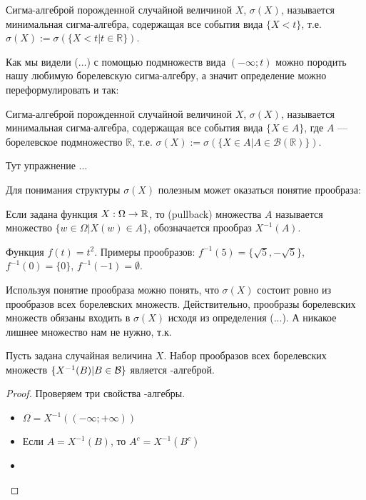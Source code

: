 {\begin{mydef}
Сигма-алгеброй порожденной случайной величиной $ X $, $ \sigma(X) $, называется минимальная сигма-алгебра, содержащая все события вида $ \{X<t\} $, т.е. $ \sigma(X):=\sigma(\{X<t|t\in \mathbb{R}\}) $.
\end{mydef}

Как мы видели (...) с помощью подмножеств вида $ (-\infty;t) $ можно породить нашу любимую борелевскую сигма-алгебру, а значит определение можно переформулировать и так:

\begin{mydef}
Сигма-алгеброй порожденной случайной величиной $ X $, $ \sigma(X) $, называется минимальная сигма-алгебра, содержащая все события вида $ \{X\in A\} $, где $ A $ --- борелевское подмножество $ \mathbb{R} $, т.е. $ \sigma(X):=\sigma(\{X\in A|A\in \mathcal{B}(\mathbb{R})\}) $.
\end{mydef}

Тут упражнение ...

Для понимания структуры $ \sigma(X) $ полезным может оказаться понятие прообраза:

\begin{mydef} Если задана функция $X:\Omega \rightarrow \mathbb R$, то  (pullback) множества $A$ называется множество $\{w\in\Omega|X(w)\in A\}$, обозначается прообраз $X^{-1}(A)$.
\end{mydef}

\begin{myex} Функция $f(t)=t^{2}$. Примеры прообразов: $f^{-1}(5)=\{\sqrt{5},-\sqrt{5}\}$, $f^{-1}(0)=\{0\}$, $f^{-1}(-1)=\emptyset$.
\end{myex}

Используя понятие прообраза можно понять, что $ \sigma(X) $ состоит ровно из прообразов всех борелевских множеств. Действительно, прообразы борелевских множеств обязаны входить в $ \sigma(X) $ исходя из определения (...). А никакое лишнее множество нам не нужно, т.к. 

\begin{myth} Пусть задана случайная величина $X$. Набор прообразов всех борелевских множеств $\{X^{-1}(B)|B\in\mathcal{B}\}$ является \s-алгеброй.
\end{myth}
\begin{proof} Проверяем три свойства \s-алгебры.
\begin{itemize}
\item $ \Omega=X^{-1}((-\infty;+\infty)) $
\item Если $ A=X^{-1}(B) $, то $ A^{c}=X^{-1}(B^{c}) $
\item 
\end{itemize}



\end{proof}}
